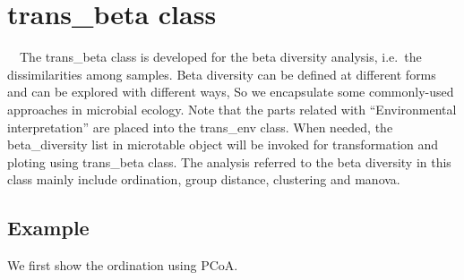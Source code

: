 \documentclass[
]{book}
\newenvironment{Shaded}{\begin{snugshade}}{\end{snugshade}}
\newcommand{\AttributeTok}[1]{\textcolor[rgb]{0.77,0.63,0.00}{#1}}
\newcommand{\CommentTok}[1]{\textcolor[rgb]{0.56,0.35,0.01}{\textit{#1}}}
\newcommand{\FunctionTok}[1]{\textcolor[rgb]{0.00,0.00,0.00}{#1}}
\newcommand{\NormalTok}[1]{#1}
\newcommand{\OtherTok}[1]{\textcolor[rgb]{0.56,0.35,0.01}{#1}}
\newcommand{\SpecialCharTok}[1]{\textcolor[rgb]{0.00,0.00,0.00}{#1}}
\newcommand{\StringTok}[1]{\textcolor[rgb]{0.31,0.60,0.02}{#1}}
\begin{document}
\hypertarget{trans_beta-class}{%
\section{trans\_beta class}\label{trans_beta-class}}

　The trans\_beta class is developed for the beta diversity analysis, i.e.~the dissimilarities among samples.
Beta diversity can be defined at different forms\citep{Tuomisto_diversity_2010} and can be explored with different ways\citep{Anderson_Navigating_2011},
So we encapsulate some commonly-used approaches in microbial ecology\citep{Ramette_Multivariate_2007}.
Note that the parts related with ``Environmental interpretation'' are placed into the trans\_env class.
When needed, the beta\_diversity list in microtable object will be invoked for transformation and ploting using trans\_beta class.
The analysis referred to the beta diversity in this class mainly include ordination, group distance, clustering and manova.

\hypertarget{example-3}{%
\subsection{Example}\label{example-3}}

We first show the ordination using PCoA.

\begin{Shaded}
\end{Shaded}

\begin{Shaded}
\end{Shaded}
\end{document}
